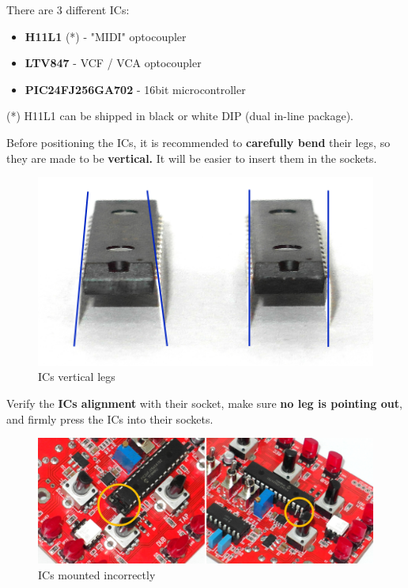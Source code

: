 \documentclass{scrartcl}
\begin{document}
There are 3 different ICs:
\begin{itemize}
    \item \textbf{H11L1} (*) - "MIDI" optocoupler
    \item \textbf{LTV847} - VCF / VCA optocoupler
    \item \textbf{PIC24FJ256GA702} - 16bit microcontroller
\end{itemize}

(*) H11L1 can be shipped in black or white DIP (dual in-line package).

Before positioning the ICs, it is recommended to \textbf{carefully bend} their legs, so they are made to be \textbf{vertical.} It will be easier to insert them in the sockets.

\vspace{0.25cm}
\begin{figure}[!ht]
    \begin{center}
        \includegraphics[scale=0.20]{assets/ic-bending.jpg}
        \caption{ICs vertical legs}
    \end{center}
\end{figure}

Verify the \textbf{ICs alignment} with their socket, make sure \textbf{no leg is pointing out}, and firmly press the ICs into their sockets.
\vspace{0.25cm}
\begin{figure}[!ht]
    \begin{center}
        \includegraphics[scale=0.28]{assets/ic-incorrect.jpg}
        \caption{ICs mounted incorrectly}
    \end{center}
\end{figure}
\end{document}
